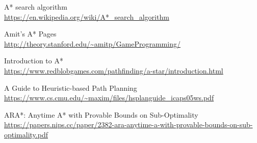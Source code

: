 \documentclass[12pt]{article}
\begin{document}
\begin{thebibliography}{1}

 A* search algorithm \\
\url{https://en.wikipedia.org/wiki/A*_search_algorithm}

 Amit’s A* Pages \\
\url{http://theory.stanford.edu/~amitp/GameProgramming/}

 Introduction to A* \\
\url{https://www.redblobgames.com/pathfinding/a-star/introduction.html}

 A Guide to Heuristic-based Path Planning \\
\url{https://www.cs.cmu.edu/~maxim/files/hsplanguide_icaps05ws.pdf}

 ARA*: Anytime A* with Provable Bounds on Sub-Optimality \\
\url{https://papers.nips.cc/paper/2382-ara-anytime-a-with-provable-bounds-on-sub-optimality.pdf}

\end{thebibliography}
\end{document}
